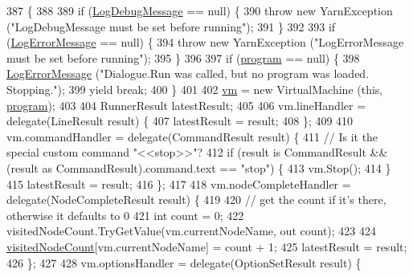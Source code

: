 \begin{DoxyCode}
387                                                                                              \{
388 
389             \textcolor{keywordflow}{if} (\hyperlink{a00092_a381f48bb0fbb294f8cf44ca57f11be31}{LogDebugMessage} == null) \{
390                 \textcolor{keywordflow}{throw} \textcolor{keyword}{new} YarnException (\textcolor{stringliteral}{"LogDebugMessage must be set before running"});
391             \}
392 
393             \textcolor{keywordflow}{if} (\hyperlink{a00092_a9801e83dd044d6498fdf6ebcc6bec5ac}{LogErrorMessage} == null) \{
394                 \textcolor{keywordflow}{throw} \textcolor{keyword}{new} YarnException (\textcolor{stringliteral}{"LogErrorMessage must be set before running"});
395             \}
396 
397             \textcolor{keywordflow}{if} (\hyperlink{a00092_a0a1cca92325f430425d784d416cb5c2b}{program} == null) \{
398                 \hyperlink{a00092_a9801e83dd044d6498fdf6ebcc6bec5ac}{LogErrorMessage} (\textcolor{stringliteral}{"Dialogue.Run was called, but no program was loaded.
       Stopping."});
399                 yield \textcolor{keywordflow}{break};
400             \}
401 
402             \hyperlink{a00092_a8c1319357a9df6cff051328fb33224c7}{vm} = \textcolor{keyword}{new} VirtualMachine (\textcolor{keyword}{this}, \hyperlink{a00092_a0a1cca92325f430425d784d416cb5c2b}{program});
403 
404             RunnerResult latestResult;
405 
406             vm.lineHandler = delegate(LineResult result) \{
407                 latestResult = result;
408             \};
409 
410             vm.commandHandler = delegate(CommandResult result) \{
411                 \textcolor{comment}{// Is it the special custom command "<<stop>>"?}
412                 \textcolor{keywordflow}{if} (result is CommandResult && (result as CommandResult).command.text == \textcolor{stringliteral}{"stop"}) \{
413                     vm.Stop();
414                 \}
415                 latestResult = result;
416             \};
417 
418             vm.nodeCompleteHandler = delegate(NodeCompleteResult result) \{
419 
420                 \textcolor{comment}{// get the count if it's there, otherwise it defaults to 0}
421                 \textcolor{keywordtype}{int} count = 0;
422                 visitedNodeCount.TryGetValue(vm.currentNodeName, out count);
423 
424                 \hyperlink{a00092_aae9e64354066a1e2fa130629959d772b}{visitedNodeCount}[vm.currentNodeName] = count + 1;
425                 latestResult = result;
426             \};
427 
428             vm.optionsHandler = delegate(OptionSetResult result) \{

\end{DoxyCode}
